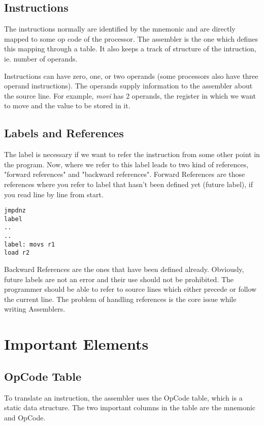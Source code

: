 \subsection{Instructions}

The instructions normally are identified by the mnemonic and are directly mapped to some op code of the processor. The assembler is the one which defines this mapping through a table. It also keeps a track of structure of the intruction, ie. number of operands. 

Instructions can have zero, one, or two operands (some processors also have three operand instructions). The operands supply information to the assembler about the source line.
For example, \textit{movi} has 2 operands, the register in which we want to move and the value to be stored in it.

\subsection{Labels and References}

The label is necessary if we want to refer the instruction from some other point in the program. Now, where we refer to this label leads to two kind of references, "forward references" and "backward references". Forward References are those references where you refer to label that hasn't been defined yet (future label), if you read line by line from start. 

\begin{lstlisting}[caption = Forward Reference in Assembly]
jmpdnz
label
..
..
label: movs r1
load r2
\end{lstlisting}

Backward References are the ones that have been defined already. Obviously, future labels are not an error and their use should not be prohibited. The programmer should be able to refer to source lines which either precede or follow the current line. The problem of handling references is the core issue while writing Assemblers.

\section{Important Elements}

\subsection{OpCode Table}

To translate an instruction, the assembler uses the OpCode table, which is a static data structure. The two important columns in the table are the mnemonic and OpCode.

